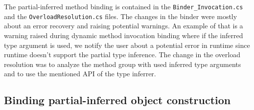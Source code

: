 The partial-inferred method binding is contained in the \texttt{Binder\_Invocation.cs} and the \texttt{OverloadResolution.cs} files. 
The changes in the binder were mostly about an error recovery and raising potential warnings. 
An example of that is a warning raised during dynamic method invocation binding where if the inferred type argument is used, we notify the user about a potential error in runtime since runtime doesn’t support the partial type inference. 
The change in the overload resolution was to analyze the method group with used inferred type arguments and to use the mentioned API of the type inferrer.

\subsection{Binding partial-inferred object construction}

